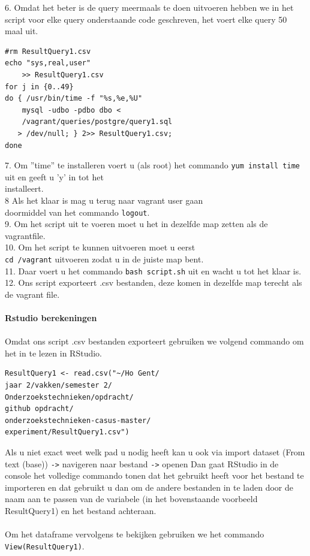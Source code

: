 \documentclass[fleqn,10pt]{artikeltin}
\begin{document}
6. Omdat het beter is de query meermaals te doen uitvoeren hebben we in het script voor elke query onderstaande code geschreven, het voert elke query 50 maal uit.
\begin{lstlisting}
#rm ResultQuery1.csv
echo "sys,real,user"
    >> ResultQuery1.csv
for j in {0..49}
do { /usr/bin/time -f "%s,%e,%U"
    mysql -udbo -pdbo dbo < 
    /vagrant/queries/postgre/query1.sql
   > /dev/null; } 2>> ResultQuery1.csv;
done
\end{lstlisting}
7. Om ''time'' te installeren voert u (als root) het commando \verb|yum install time| uit en geeft u 'y' in tot het \\installeert.\\
8 Als het klaar is mag u terug naar vagrant user gaan \\doormiddel van het commando \verb|logout|. \\
9. Om het script uit te voeren moet u het in dezelfde map zetten als de vagrantfile.\\
10. Om het script te kunnen uitvoeren moet u eerst\\ \verb|cd /vagrant| uitvoeren zodat u in de juiste map bent.\\
11. Daar voert u het commando \verb|bash script.sh| uit en wacht u tot het klaar is.\\
12. Ons script exporteert .csv bestanden, deze komen in dezelfde map terecht als de vagrant file.\\\\
\textbf{Rstudio berekeningen}\\\\
Omdat ons script .csv bestanden exporteert gebruiken we volgend commando om het in te lezen in RStudio.
\begin{lstlisting}
ResultQuery1 <- read.csv("~/Ho Gent/
jaar 2/vakken/semester 2/
Onderzoekstechnieken/opdracht/
github opdracht/
onderzoekstechnieken-casus-master/
experiment/ResultQuery1.csv")
\end{lstlisting}
Als u niet exact weet welk pad u nodig heeft kan u ook via import dataset (From text (base)) \verb|->| navigeren naar bestand \verb|->| openen
Dan gaat RStudio in de console het volledige commando tonen dat het gebruikt heeft voor het bestand te importeren en dat gebruikt u dan om de andere bestanden in te laden door de naam aan te passen van de variabele (in het bovenstaande voorbeeld ResultQuery1) en het bestand achteraan.\\\\
Om het dataframe vervolgens te bekijken gebruiken we het commando \verb|View(ResultQuery1)|.
\end{document}
